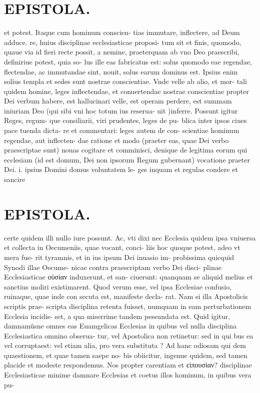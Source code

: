 \documentclass{article}
\begin{document}
\begin{pages}
\section*{EPISTOLA. }et potest. Itaque cum hominum conscien- tias immutare, inflectere, ad Deum adduce. re, huius disciplinae ecclesiasticae proposi- tum sit et finis, quomodo, quaue via id fieri recte possit, a nemine, praeterquam ab vno Deo praescribi, definiriue potest, quia so- lus ille eas fabricatus est: solus quomodo eae regendae, flectendae, ac immutandae sint, nouit, solus earum dominus est. Ipsius enim solius templa et sedes sunt nostrae conscientiae. Vnde velle ab alio, et mor- tali quidem homine, leges inflectendae, et conuertendae nostrae conscientiae propter Dei verbum habere, est hallucinari velle, est operam perdere, est summam iniuriam Deo (qui sibi vni hoc totum ius reserua- uit )inferre. Possunt igitur Reges, regum- que consiliarii, viri prudentes, leges de pu- blica inter ipsos ciues pace tuenda dicta- re et commentari: leges autem de con- scientiae hominum regendae, aut inflecten- dae ratione et modo (praeter eas, quae Dei verbo praescriptae sunt) nouas cogitare et comminisci, denique de legitima eorum qui ecclesiam (id est domum, Dei non ipsorum Regum gubernant) vocatione praeter Dei. i. ipsius Domini domus voluntatem le- ges inquam et regulas condere et sancire 
\section*{EPISTOLA. }certe quidem illi nullo iure possunt. Ac, vti dixi nec Ecclesia quidem ipsa vniuersa et collecta in Oecumeniis, quae vocant, conci- liis hoc quoque potest, adeo vt mera fue- rit tyramnis, et in ius ipsum Dei inuasio im- probissima quicquid Synodi illae Oecume- nicae contra praescriptam verbo Dei disci- plinae Ecclesiasticae οὐσίαν induxerunt, et san- ciuerunt: quanquam se aliquid melius et sanctius moliri existimarent. Quod verum esse, vel ipsa Ecclesiae confusio, ruinaque, quae inde con secuta est, manifeste decla- rat. Nam si illa Apostolicis scriptis prae- scripta disciplina retenta fuisset, numquam in eam perturbationem Ecclesia incidis- set, a qua miserrime tandem pessundata est. Quid igitur, damnamûsne omnes eas Euamgelicas Ecclesias in quibus vel nulla disciplina Ecclesiastica omnino obserua- tur, vel Apostolica non retinetur: sed in qui bus ea vel corruptaest: vel etiam alia, pro vera substituta ? Ad hanc odiosam qui dem quaestionem, et quae tamen saepe no- bis obiicitur, ingenue quidem, sed tamen placide et modeste respondemus. Nos propter carentiam et εἰπουσίαν? disciplinae Ecclesiasticae minime damnare Ecclesias et coetus illos hominum, in quibus vera pu- 

\end{pages}
\end{document}

